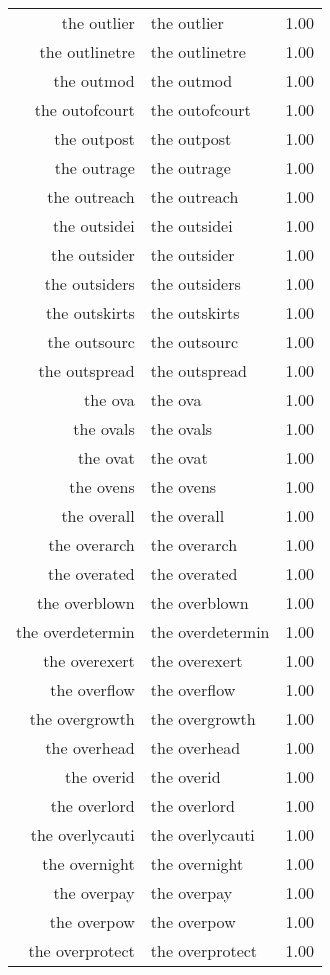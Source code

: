 \begin{table}[ht]
\begin{tabular}{rlr}
  the outlier & the outlier & 1.00 \\ 
  the outlinetre & the outlinetre & 1.00 \\ 
  the outmod & the outmod & 1.00 \\ 
  the outofcourt & the outofcourt & 1.00 \\ 
  the outpost & the outpost & 1.00 \\ 
  the outrage & the outrage & 1.00 \\ 
  the outreach & the outreach & 1.00 \\ 
  the outsidei & the outsidei & 1.00 \\ 
  the outsider & the outsider & 1.00 \\ 
  the outsiders & the outsiders & 1.00 \\ 
  the outskirts & the outskirts & 1.00 \\ 
  the outsourc & the outsourc & 1.00 \\ 
  the outspread & the outspread & 1.00 \\ 
  the ova & the ova & 1.00 \\ 
  the ovals & the ovals & 1.00 \\ 
  the ovat & the ovat & 1.00 \\ 
  the ovens & the ovens & 1.00 \\ 
  the overall & the overall & 1.00 \\ 
  the overarch & the overarch & 1.00 \\ 
  the overated & the overated & 1.00 \\ 
  the overblown & the overblown & 1.00 \\ 
  the overdetermin & the overdetermin & 1.00 \\ 
  the overexert & the overexert & 1.00 \\ 
  the overflow & the overflow & 1.00 \\ 
  the overgrowth & the overgrowth & 1.00 \\ 
  the overhead & the overhead & 1.00 \\ 
  the overid & the overid & 1.00 \\ 
  the overlord & the overlord & 1.00 \\ 
  the overlycauti & the overlycauti & 1.00 \\ 
  the overnight & the overnight & 1.00 \\ 
  the overpay & the overpay & 1.00 \\ 
  the overpow & the overpow & 1.00 \\ 
  the overprotect & the overprotect & 1.00 \\ 

\end{tabular}
\end{table}
